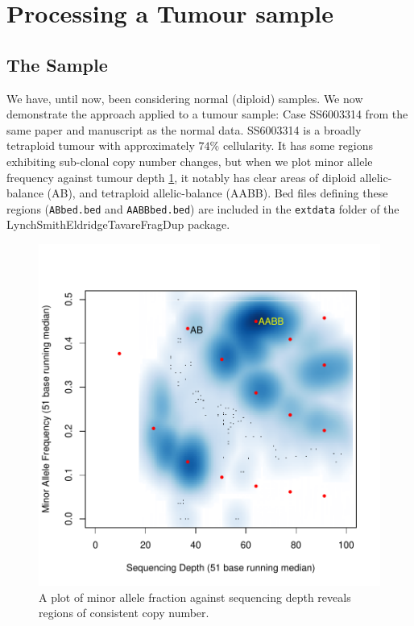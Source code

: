 \documentclass{article}
\begin{document}
\clearpage{}


\section{Processing a Tumour sample}
\label{sec:Tumour}


\subsection{The Sample}

We have, until now, been considering normal (diploid) samples. We now demonstrate the approach applied to a tumour sample: Case SS6003314 from the same paper and manuscript as the normal data. SS6003314 is a broadly tetraploid tumour with approximately $74\%$ cellularity. It has some regions exhibiting sub-clonal copy number changes, but when we plot minor allele frequency against tumour depth \ref{Tumourexample}, it notably has clear areas of diploid allelic-balance (AB), and tetraploid allelic-balance (AABB). Bed files defining these regions (\texttt{ABbed.bed} and \texttt{AABBbed.bed}) are included in the \texttt{extdata} folder of the LynchSmithEldridgeTavareFragDup package.

\begin{figure}[tbh]
\begin{center}
\includegraphics[width=\textwidth]{SS6003314.pdf}
\end{center}
\caption{A plot of minor allele fraction against sequencing depth reveals regions of consistent copy number.}
\label{Tumourexample}
\end{figure}
\end{document}

